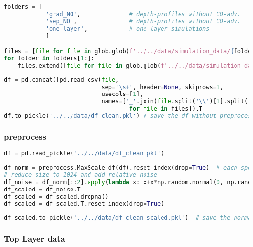 \begin{lstlisting}[language=Python]
folders = [
            'grad_NO',              # depth-profiles without CO-adv.    with gradient layers
            'sep_NO',               # depth-profiles without CO-adv.    with separated layers
            'one_layer',            # one-layer simulations
            ]

files = [file for file in glob.glob(f'../../data/simulation_data/{folders[0]}/*.spc')]
for folder in folders[1:]:
    files.extend([file for file in glob.glob(f'../../data/simulation_data/{folder}/*.spc')])
\end{lstlisting}

\begin{lstlisting}[language=Python]
df = pd.concat([pd.read_csv(file,
                            sep='\s+', header=None, skiprows=1,
                            usecols=[1],
                            names=['_'.join(file.split('\\')[1].split('_')[:-1])]).T 
                                    for file in files]).T
df.to_pickle('../../data/df_clean.pkl') # save the df without preprocessing
\end{lstlisting}

\hypertarget{preprocess-2}{%
\subsubsection{preprocess}\label{preprocess-2}}

\begin{lstlisting}[language=Python]
df = pd.read_pickle('../../data/df_clean.pkl') 
\end{lstlisting}

\begin{lstlisting}[language=Python]
df_norm = preprocess.MaxScale_df(df).reset_index(drop=True)  # each spectrum is scaled to 1
# reduce size to 1024 and add relative noise
df_noise = df_norm[::2].apply(lambda x: x+x*np.random.normal(0, np.random.randint(1,3)*0.01 , len(x)))
df_scaled = df_noise.T
df_scaled = df_scaled.dropna()
df_scaled = df_scaled.T.reset_index(drop=True)
\end{lstlisting}

\begin{lstlisting}[language=Python]
df_scaled.to_pickle('../../data/df_clean_scaled.pkl')  # save the normalized, scaled df
\end{lstlisting}

\hypertarget{top-layer-data-2}{%
\subsubsection{Top Layer data}\label{top-layer-data-2}}


